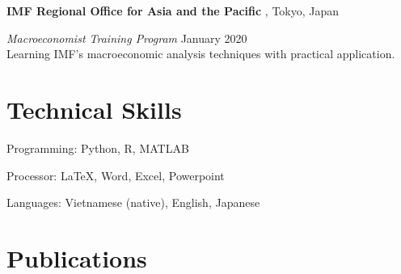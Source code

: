\documentclass[a4paper,20pt]{article}
\begin{document}
	\textbf{IMF Regional Office for Asia and the Pacific }, Tokyo, Japan
	
	\hspace{4mm} \textit{Macroeconomist Training Program} \hfill {January 2020} \\
	\hspace{4mm} Learning IMF's macroeconomic analysis techniques with practical application.
	\vspace{4pt}
	
	
	\section{Technical Skills}
	\begin{description}
		\item Programming: Python, R, MATLAB
		\vspace*{-7pt}
		\item Processor: \LaTeX, Word, Excel, Powerpoint
		\vspace*{-7pt}
		\item Languages: Vietnamese (native), English, Japanese
	\end{description}
	\vspace{4pt}
	
	\vspace{-5pt}
	\section{Publications}
	\nocite{*}
	
	
\end{document}
